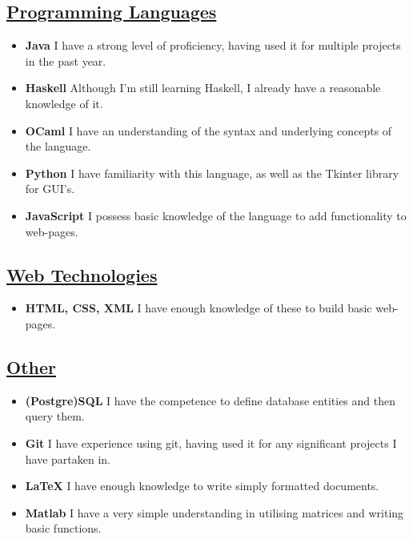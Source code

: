 \documentclass[11pt]{article}
\begin{document}
		\subsection*{\underline{Programming Languages}}
		\begin{itemize}
			\item \textbf{Java} I have a strong level of proficiency, having used it for multiple projects in the past year.
			\item \textbf{Haskell} Although I'm still learning Haskell, I already have a reasonable knowledge of it.
			\item \textbf{OCaml} I have an understanding of the syntax and underlying concepts of the language.
			\item \textbf{Python} I have familiarity with this language, as well as the Tkinter library for GUI's. 
			\item \textbf{JavaScript} I possess basic knowledge of the language to add functionality to web-pages.
		\end{itemize} 
		\subsection*{\underline{Web Technologies}}
		\begin{itemize}
			\item \textbf{HTML, CSS, XML} I have enough knowledge of these to build basic web-pages.
		\end{itemize}
		\subsection*{\underline{Other}}
		\begin{itemize}
			\item \textbf{(Postgre)SQL} I have the competence to define database entities and then query them.
			\item \textbf{Git} I have experience using git, having used it for any significant projects I have partaken in.
			\item \textbf{LaTeX} I have enough knowledge to write simply formatted documents.
			\item \textbf{Matlab} I have a very simple understanding in utilising matrices and writing basic functions.
		\end{itemize}
\end{document}

